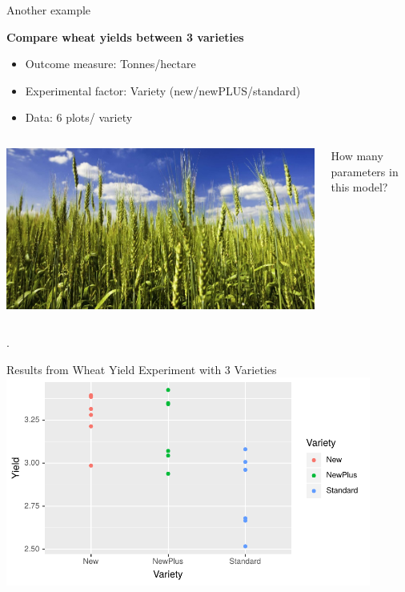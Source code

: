 \documentclass[10pt]{beamer}
\begin{document}
\begin{frame}{Another example}

\begin{block}{\textbf{Compare wheat yields between 3 varieties}}
\begin{itemize}
  \item Outcome measure: Tonnes/hectare
  \item Experimental factor: Variety (new/newPLUS/standard)
  \item Data:  6 plots/ variety
\end{itemize}
\end{block}

\begin{columns}
 \begin{column}{0.5\textwidth}
  \includegraphics[width=\textwidth]{Figures/wheat}
 \end{column}
\begin{column}{0.5\textwidth}
    How many parameters in this model?
 \end{column}
\end{columns}

.
\end{frame}

\begin{frame}{Results from Wheat Yield Experiment with 3 Varieties}
 \includegraphics[width=0.9\textwidth]{Figures/wheatyield}
\end{frame}
\end{document}
